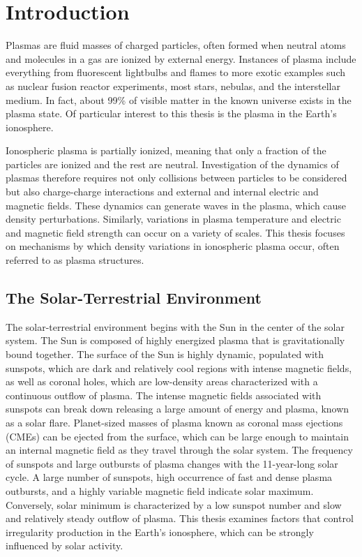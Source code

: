 
\chapter{Introduction}
\label{sec:introduction}

Plasmas are fluid masses of charged particles, often formed when neutral atoms and mol\-e\-cules in a gas are ionized by external energy.  Instances of plasma include everything from fluorescent lightbulbs and flames to more exotic examples such as nuclear fusion reactor experiments, most stars, nebulas, and the interstellar medium.  In fact, about 99\% of visible matter in the known universe exists in the plasma state.  Of particular interest to this thesis is the plasma in the Earth's ionosphere.

Ionospheric plasma is partially ionized, meaning that only a fraction of the particles are ionized and the rest are neutral.  Investigation of the dynamics of plasmas therefore requires not only collisions between particles to be considered but also charge-charge interactions and external and internal electric and magnetic fields.  These dynamics can generate waves in the plasma, which cause density perturbations.  Similarly, variations in plasma temperature and electric and magnetic field strength can occur on a variety of scales.  This thesis focuses on mechanisms by which density variations in ionospheric plasma occur, often referred to as plasma structures.

\section{The Solar-Terrestrial Environment}
The solar-terrestrial environment begins with the Sun in the center of the solar system.  The Sun is composed of highly energized plasma that is gravitationally bound together.  The surface of the Sun is highly dynamic, populated with sunspots, which are dark and relatively cool regions with intense magnetic fields, as well as coronal holes, which are low-density areas characterized with a continuous outflow of plasma.  The intense magnetic fields associated with sunspots can break down releasing a large amount of energy and plasma, known as a solar flare.  Planet-sized masses of plasma known as coronal mass ejections (CMEs) can be ejected from the surface, which can be large enough to maintain an internal magnetic field as they travel through the solar system.  The frequency of sunspots and large outbursts of plasma changes with the 11-year-long solar cycle.  A large number of sunspots, high occurrence of fast and dense plasma outbursts, and a highly variable magnetic field indicate solar maximum.  Conversely, solar minimum is characterized by a low sunspot number and slow and relatively steady outflow of plasma.  This thesis examines factors that control irregularity production in the Earth's ionosphere, which can be strongly influenced by solar activity.

